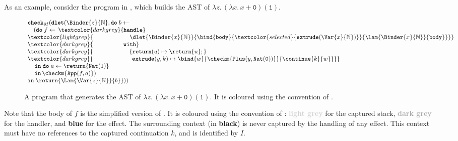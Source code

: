 As an example, consider the program in , which builds the AST of $\lambda z. \, (\lambda x. \, x + \texttt{0}) (\texttt{1})$.
\begin{figure}
\[\begin{array}{l}
  \textbf{\texttt{check}}_M(\textbf{\texttt{dlet}}(\Binder{z}{\mathbb{N}}, \textbf{\texttt{do}} \; b \leftarrow \, \\ 
  \quad (\textbf{\texttt{do}} \; f \leftarrow \, \textcolor{darkgrey}{\textbf{\texttt{handle}}} \\
  \textcolor{lightgrey}{\;\;\;\,\quad \quad \quad\quad\quad {\dlet{\Binder{x}{\mathbb{N}}}{
  \bind{\texttt{body}}{\textcolor{selected}{\textbf{\texttt{extrude}}(\Var{x}{\mathbb{N}})}}{\Lam{\Binder{x}{\mathbb{N}}}{\texttt{body}}}}}} \\ 
  \textcolor{darkgrey}{\;\;\;\,\quad \quad\quad\quad \textbf{\texttt{with}}} \\ 
  \textcolor{darkgrey}{\;\;\;\,\quad \quad\quad\quad \quad \{ \textbf{\texttt{return}}(u) \mapsto {\return{u}};} \\ 
  \textcolor{darkgrey}{\;\;\;\, \quad \quad\quad\quad \quad \;\, \textbf{\texttt{extrude}}(y, k) \mapsto {\bind{w}{\checkm{\texttt{Plus}(y, \texttt{Nat}(\texttt{0}))}}{\continue{k}{w}}}\}} \\ 
  \, \quad \textbf{\texttt{in}} \; \textbf{\texttt{do}} \; {a}\leftarrow {\return{\texttt{Nat}(\texttt{1})}}\\
  \, \quad \textbf{\texttt{in}} \, {\checkm{\texttt{App}(f, a)}})\; \\
  \textbf{\texttt{in}} \; \return{\Lam{\Var{z}{\mathbb{N}}}{b}})) 
\end{array}\]
\caption{A \coreLang{} program that generates the AST of $\lambda z. \, (\lambda x. \, x + \texttt{0}) (\texttt{1})$. It is coloured using the convention of .}
\label{fig:core-unmute-example}
\end{figure}
Note that the body of $f$ is the simplified version of . It is coloured using the convention of : \textbf{\textcolor{lightgrey}{light grey}} for the captured stack, \textbf{\textcolor{darkgrey}{dark grey}} for the handler, and \textbf{\textcolor{selected}{blue}} for the effect. The surrounding context (in \textbf{black}) is never captured by the handling of any effect. This context must have no references to the captured continuation $k$, and is identified by $I$.

